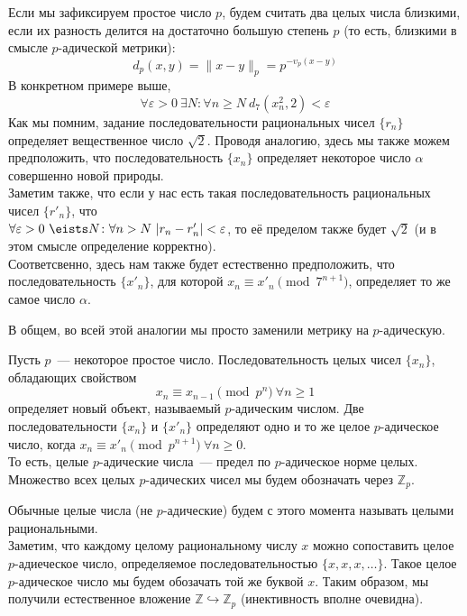 \documentclass[11pt]{article}
\begin{document}
    Если мы зафиксируем простое число $p$, будем считать два целых числа близкими, если их разность делится на достаточно большую
    степень $p$ (то есть, близкими в смысле $p$-адической метрики):
    \[ d_p(x, y) = \| x - y \|_p = p^{-\upsilon_p(x - y)}\]
    В конкретном примере выше,
    \[ \forall \varepsilon > 0 \ \exists N\colon \forall n \ge N \  d_7(x_n^2, 2) < \varepsilon \]
    Как мы помним, задание последовательности рациональных чисел $\{ r_n \}$ определяет вещественное число $\sqrt{2}$.
    Проводя аналогию, здесь мы также можем предположить, что последовательность $\{ x_n \}$ определяет некоторое
    число $\alpha$ совершенно новой природы. \\
    Заметим также, что если у нас есть такая последовательность рациональных чисел $\{ r'_n \}$, что \\$\forall \varepsilon > 0 \ \eists N\colon \forall n > N \ |r_n - r'_n| < \varepsilon $, то
    её пределом также будет $\sqrt{2}$ (и в этом смысле определение корректно).\\
    Соответсвенно, здесь нам также будет естественно предположить, что последовательность $\{ x'_n \}$, для которой $x_n \equiv x'_n \pmod{7^{n + 1}}$, определяет то же самое число $\alpha$.
    \begin{remark}
        В общем, во всей этой аналогии мы просто заменили метрику на $p$-адическую.
    \end{remark}
    \begin{definition}
        Пусть $p$~--- некоторое простое число. Последовательность целых чисел $\{ x_n \}$, обладающих свойством
        \[ x_n \equiv x_{n - 1} \pmod{p^n} \ \forall n \ge 1\]
        определяет новый объект, называемый $p$-адическим числом. Две последовательности $\{ x_n \}$ и $\{ x'_n \}$ определяют одно и то же
        целое $p$-адическое число, когда $x_n \equiv x'_n \pmod{p^{n + 1}} \ \forall n \ge 0$.\\
        То есть, целые $p$-адические числа~--- предел по $p$-адическое норме целых.\\
        Множество всех целых $p$-адических чисел мы будем обозначать через $\mathbb{Z}_p$.\\
    \end{definition}
    Обычные целые числа (не $p$-адические) будем с этого момента называть целыми рациональными.\\


    Заметим, что каждому целому рациональному числу $x$ можно сопоставить целое $p$-адиеческое число, определяемое последовательностью
    $\{ x, x, x, \ldots \}$. Такое целое $p$-адическое число мы будем обозачать той же буквой $x$. Таким образом, мы получили естественное
    вложение $\mathbb{Z} \hookrightarrow \mathbb{Z}_p$ (инективность вполне очевидна).
\end{document}

